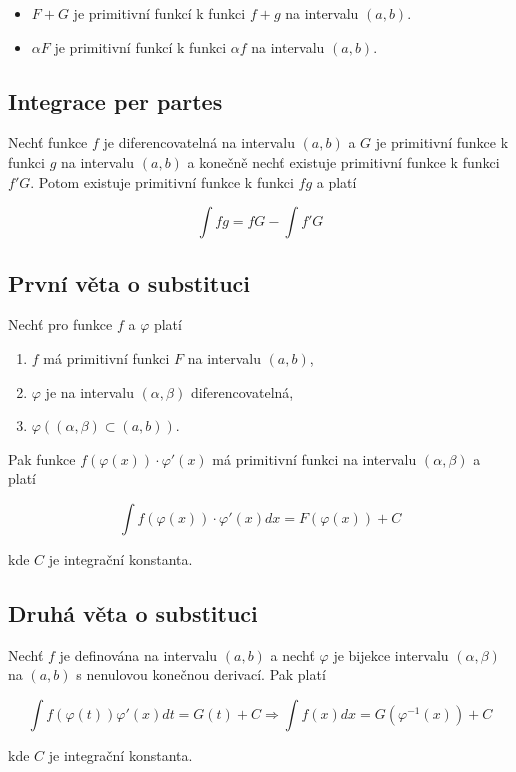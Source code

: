 \begin{itemize}
    \item $F + G$ je primitivní funkcí k funkci $f + g$ na intervalu $(a, b)$.
    \item $\alpha F$ je primitivní funkcí k funkci $\alpha f$ na intervalu $(a, b)$.
\end{itemize}

\subsection*{Integrace per partes}

Nechť funkce $f$ je diferencovatelná na intervalu $(a, b)$ a $G$ je primitivní
funkce k funkci $g$ na intervalu $(a, b)$ a konečně nechť existuje primitivní
funkce k funkci $f'G$. Potom existuje primitivní funkce k funkci $fg$ a platí

\[ \int fg = fG - \int f'G\]

\subsection*{První věta o substituci}

Nechť pro funkce $f$ a $\varphi$ platí

\begin{enumerate}
    \item $f$ má primitivní funkci $F$ na intervalu $(a, b)$,
    \item $\varphi$ je na intervalu $(\alpha, \beta)$ diferencovatelná,
    \item $\varphi((\alpha, \beta) \subset (a, b))$.
\end{enumerate}

\noindent Pak funkce $f(\varphi(x))\cdot \varphi'(x)$ má primitivní funkci na intervalu $(\alpha, \beta)$ a platí

\[ \int f(\varphi(x)) \cdot \varphi'(x) dx = F(\varphi(x)) + C \]

\noindent kde $C$ je integrační konstanta.

\subsection*{Druhá věta o substituci}

Nechť $f$ je definována na intervalu $(a, b)$ a nechť $\varphi$ je bijekce
intervalu $(\alpha, \beta)$ na $(a, b)$ s nenulovou konečnou derivací. Pak
platí

\[ \int f(\varphi(t))\varphi'(x)dt = G(t) + C \Rightarrow \int f(x)dx = G(\varphi^{-1}(x)) + C \]

\noindent kde $C$ je integrační konstanta.

\pagebreak
